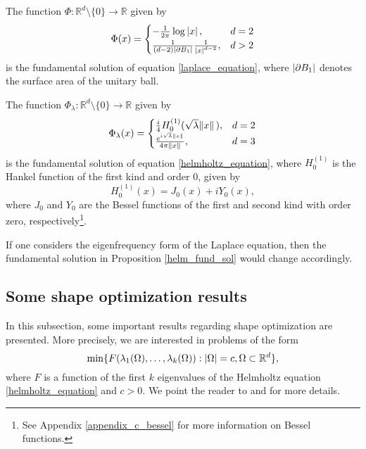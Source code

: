 \begin{proposition}
    The function \(\Phi: \mathbb{R}^d \setminus \{0\} \rightarrow \mathbb{R}\) given by
    \[
    \Phi(x) = \begin{cases}
        -\frac{1}{2 \pi} \log \abs*{x}, & d=2\\
        \frac{1}{(d-2)\abs{\partial B_1}}\frac{1}{\abs*{x}^{d-2}}, & d > 2
    \end{cases}    
    \]
    is the fundamental solution of equation \eqref{laplace_equation}, where \(\abs{\partial B_1}\) denotes the surface area of the unitary ball.
\end{proposition}
\begin{proposition}\label{helm_fund_sol}
    The function \(\Phi_\lambda: \mathbb{R}^d \setminus \{0\} \rightarrow \mathbb{R}\) given by
    \[
    \Phi_\lambda(x) = \begin{cases}
        \frac{i}{4} H_0^{(1)}(\sqrt{\lambda} \norm*{x}), & d=2\\
        \frac{e^{i \sqrt{\lambda} \norm*{x}}}{4 \pi \norm*{x}}, & d = 3
    \end{cases}    
    \]
    is the fundamental solution of equation \eqref{helmholtz_equation}, where \(H_0^{(1)}\) is the Hankel function of the first kind and order 0, given by
    \[
        H_0^{(1)}(x) = J_0(x) + i Y_0(x),
    \]
    where \(J_0\) and \(Y_0\) are the Bessel functions of the first and second kind with order zero, respectively\footnote{See Appendix \ref{appendix_c_bessel} for more information on Bessel functions.}.
\end{proposition}

If one considers the eigenfrequency form of the Laplace equation, then the fundamental solution in Proposition \ref{helm_fund_sol} would change accordingly.

\subsection{Some shape optimization results}

In this subsection, some important results regarding shape optimization are presented. More precisely, we are interested in problems of the form
\begin{equation}\label{shape_prob}
    \min\{F(\lambda_1(\Omega),\dots, \lambda_k(\Omega)): \abs{\Omega} = c, \Omega \subset \mathbb{R}^d\},
\end{equation}
where \(F\) is a function of the first \(k\) eigenvalues of the Helmholtz equation \eqref{helmholtz_equation} and \(c > 0\). We point the reader to \cite{henrot2006extremum} and \cite{henrot2017shape} for more details.

